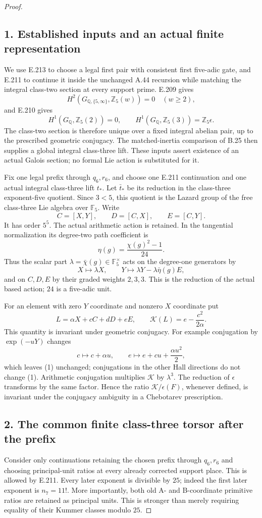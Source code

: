 \documentclass[11pt]{article}
\newcommand{\Z}{\mathbb Z}\newcommand{\F}{\mathbb F}\newcommand{\Q}{\mathbb Q}
\begin{document}
\begin{proof}
\subsection*{1. Established inputs and an actual finite representation}
We use E.213 to choose a legal first pair with consistent first five-adic gate, and E.211 to continue it inside the unchanged A.44 recursion while matching the integral class-two section at every support prime. E.209 gives
\[
 H^2(G_{\Q,\{5,\infty\}},\Z_5(w))=0\quad(w\ge2),
\]
and E.210 gives
\[
 H^1(G_\Q,\Z_5(2))=0,\qquad
 H^1(G_\Q,\Z_5(3))=\Z_5\epsilon.
\]
The class-two section is therefore unique over a fixed integral abelian pair, up to the prescribed geometric conjugacy. The matched-inertia comparison of B.25 then supplies a global integral class-three lift. These inputs assert existence of an actual Galois section; no formal Lie action is substituted for it.

Fix one legal prefix through $q_6,r_6$, and choose one E.211 continuation and one actual integral class-three lift $t_*$. Let $\bar t_*$ be its reduction in the class-three exponent-five quotient. Since $3<5$, this quotient is the Lazard group of the free class-three Lie algebra over $\F_5$. Write
\[
 C=[X,Y],\qquad D=[C,X],\qquad E=[C,Y].
\]
It has order $5^5$. The actual arithmetic action is retained. In the tangential normalization its degree-two path coefficient is
\[
 \eta(g)=\frac{\chi(g)^2-1}{24}.
\]
Thus the scalar part $\lambda=\bar\chi(g)\in\F_5^\times$ acts on the degree-one generators by
\[
 X\longmapsto\lambda X,\qquad
 Y\longmapsto\lambda Y-\lambda\bar\eta(g)E,
\]
and on $C,D,E$ by their graded weights $2,3,3$. This is the reduction of the actual based action; $24$ is a five-adic unit.

For an element with zero $Y$ coordinate and nonzero $X$ coordinate put
\[
 L=\alpha X+cC+dD+eE,\qquad
 \mathcal K(L)=e-\frac{c^2}{2\alpha}.
 \tag{1}
\]
This quantity is invariant under geometric conjugacy. For example conjugation by $\exp(-uY)$ changes
\[
 c\mapsto c+\alpha u,\qquad
 e\mapsto e+cu+\frac{\alpha u^2}{2},
\]
which leaves (1) unchanged; conjugations in the other Hall directions do not change (1). Arithmetic conjugation multiplies $\mathcal K$ by $\lambda^3$. The reduction of $\epsilon$ transforms by the same factor. Hence the ratio $\mathcal K/\epsilon(F)$, whenever defined, is invariant under the conjugacy ambiguity in a Chebotarev prescription.

\subsection*{2. The common finite class-three torsor after the prefix}
Consider only continuations retaining the chosen prefix through $q_6,r_6$ and choosing principal-unit ratios at every already corrected support place. This is allowed by E.211. Every later exponent is divisible by $25$; indeed the first later exponent is $n_7=11!$. More importantly, both old A- and B-coordinate primitive ratios are retained as principal units. This is stronger than merely requiring equality of their Kummer classes modulo $25$.


\end{proof}
\end{document}

